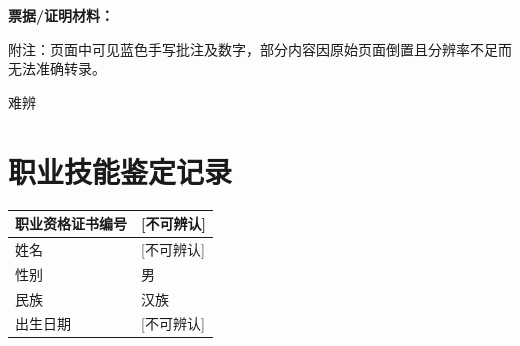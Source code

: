 \documentclass[UTF8,10pt,a4paper,fontset=fandol]{ctexart}
\newcommand{\fieldvalue}[1]{#1}
\newcommand{\handwritten}[1]{#1}
\begin{document}
\vspace{1em}

\noindent
\textbf{票据/证明材料：}

\begin{center}
\end{center}

\vspace{0.5em}

\noindent
附注：页面中可见蓝色手写批注及数字，部分内容因原始页面倒置且分辨率不足而无法准确转录。

\handwritten{难辨}


\newpage

\section*{职业技能鉴定记录}

\begin{tabularx}{\textwidth}{|l|X|}
\hline
职业资格证书编号 &
\fieldvalue{\handwritten{[不可辨认]}} \\
\hline
姓名 &
\fieldvalue{\handwritten{[不可辨认]}} \\
\hline
性别 &
\fieldvalue{男} \\
\hline
民族 &
\fieldvalue{汉族} \\
\hline
出生日期 &
\fieldvalue{\handwritten{[不可辨认]}} \\
\hline
\end{tabularx}

\vspace{0.5em}
\end{document}
